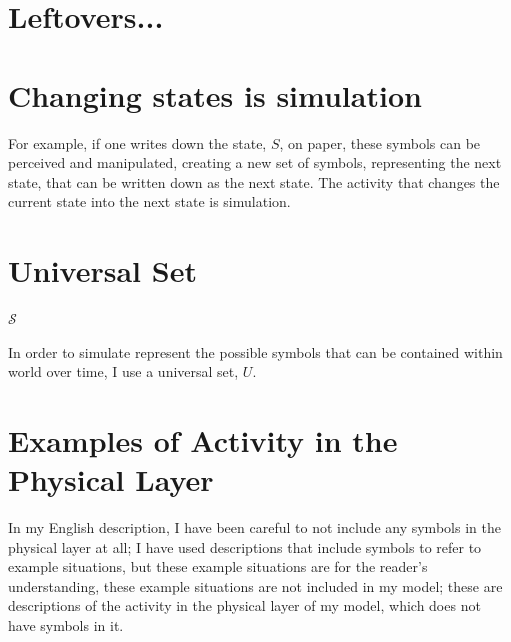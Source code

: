 \section{Leftovers...}

\section{Changing states is simulation}

For example, if one writes down the state, $S$, on paper, these
symbols can be perceived and manipulated, creating a new set of
symbols, representing the next state, that can be written down as the
next state.  The activity that changes the current state into the next
state is simulation.

\section{Universal Set}

$\mathcal{S}$

In order to simulate represent the possible symbols that can be
contained within world over time, I use a universal set, $U$.


\section{Examples of Activity in the Physical Layer}

In my English description, I have been careful to not include any
symbols in the physical layer at all; I have used descriptions that
include symbols to refer to example situations, but these example
situations are for the reader's understanding, these example
situations are not included in my model; these are descriptions of the
activity in the physical layer of my model, which does not have
symbols in it.


